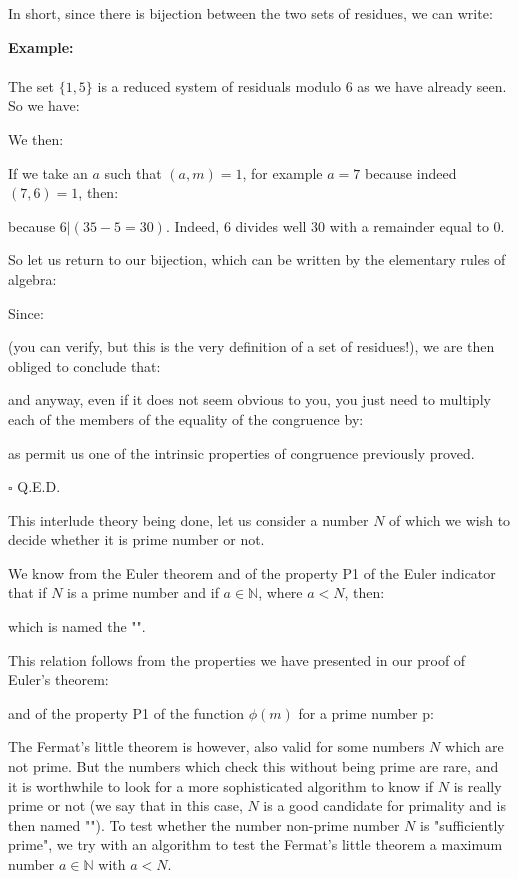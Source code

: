 \begin{dem}
	In short, since there is bijection between the two sets of residues, we can write:
	
	\begin{tcolorbox}[colframe=black,colback=white,sharp corners]
	\textbf{{\Large {}}Example:}\\\\
	The set $\{1,5\}$ is a reduced system of residuals modulo $6$ as we have already seen. So we have:
	
	We then:
	
	If we take an $a$ such that $(a,m)=1$, for example $a=7$ because indeed $(7,6)=1$, then:
	
	because $6|(35-5=30)$. Indeed, $6$ divides well $30$ with a remainder equal to $0$.
	\end{tcolorbox}
	So let us return to our bijection, which can be written by the elementary rules of algebra:
	
	Since:
	
	(you can verify, but this is the very definition of a set of residues!), we are then obliged to conclude that:
	
	and anyway, even if it does not seem obvious to you, you just need to multiply each of the members of the equality of the congruence by:
	
	as permit us one of the intrinsic properties of congruence previously proved.
	\begin{flushright}
		$\square$  Q.E.D.
	\end{flushright}
	\end{dem}
	This interlude theory being done, let us consider a number $N$ of which we wish to decide whether it is prime number or not.

	We know from the Euler theorem and of the property P1 of the Euler indicator that if $N$ is a prime number and if $a\in\mathbb{N}$, where $a<N$, then:
	
	which is named the "".
	\begin{tcolorbox}[title=Remark,colframe=black,arc=10pt]
	This relation follows from the properties we have presented in our proof of Euler's theorem:
	
	and of the property P1 of the function $\phi(m)$ for a prime number p:
	
	\end{tcolorbox}
	The Fermat's little theorem is however, also valid for some numbers $N$ which are not prime. But the numbers which check this without being prime are rare, and it is worthwhile to look for a more sophisticated algorithm to know if $N$ is really prime or not (we say that in this case, $N$ is a good candidate for primality and is then named ""). To test whether the number non-prime number $N$ is "sufficiently prime", we try with an algorithm to test the Fermat's little theorem a maximum number $a\in\mathbb{N}$ with $a<N$.
	
